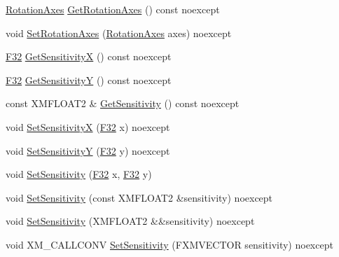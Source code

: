 \begin{DoxyCompactItemize}
\item 
\hyperlink{classmage_1_1script_1_1_mouse_look_script_aa8c8ce1a3e6ccefa7b8ddd31be209c23}{Rotation\+Axes} \hyperlink{classmage_1_1script_1_1_mouse_look_script_a612d8c23cc3f0711a07b32304082dfb5}{Get\+Rotation\+Axes} () const noexcept
\item 
void \hyperlink{classmage_1_1script_1_1_mouse_look_script_a82697e11738554a44b4a749227e231ee}{Set\+Rotation\+Axes} (\hyperlink{classmage_1_1script_1_1_mouse_look_script_aa8c8ce1a3e6ccefa7b8ddd31be209c23}{Rotation\+Axes} axes) noexcept
\item 
\hyperlink{namespacemage_aa97e833b45f06d60a0a9c4fc22ae02c0}{F32} \hyperlink{classmage_1_1script_1_1_mouse_look_script_a86ee9593f0221bfa259f5ae5dd6edb30}{Get\+SensitivityX} () const noexcept
\item 
\hyperlink{namespacemage_aa97e833b45f06d60a0a9c4fc22ae02c0}{F32} \hyperlink{classmage_1_1script_1_1_mouse_look_script_a39303e2d535ecc610ac4ea2f23825452}{Get\+SensitivityY} () const noexcept
\item 
const X\+M\+F\+L\+O\+A\+T2 \& \hyperlink{classmage_1_1script_1_1_mouse_look_script_a5dbf9911e65f1462e2ca84f70b8871d9}{Get\+Sensitivity} () const noexcept
\item 
void \hyperlink{classmage_1_1script_1_1_mouse_look_script_a97c2564df1660fb9d07f9a4269a77568}{Set\+SensitivityX} (\hyperlink{namespacemage_aa97e833b45f06d60a0a9c4fc22ae02c0}{F32} x) noexcept
\item 
void \hyperlink{classmage_1_1script_1_1_mouse_look_script_a95376c27d55cf12d557427b68ccbd802}{Set\+SensitivityY} (\hyperlink{namespacemage_aa97e833b45f06d60a0a9c4fc22ae02c0}{F32} y) noexcept
\item 
void \hyperlink{classmage_1_1script_1_1_mouse_look_script_a6116637b42e58b8f40de86ed47b54fe3}{Set\+Sensitivity} (\hyperlink{namespacemage_aa97e833b45f06d60a0a9c4fc22ae02c0}{F32} x, \hyperlink{namespacemage_aa97e833b45f06d60a0a9c4fc22ae02c0}{F32} y)
\item 
void \hyperlink{classmage_1_1script_1_1_mouse_look_script_ae87f7d74fa3863b5595fd4428c55caf5}{Set\+Sensitivity} (const X\+M\+F\+L\+O\+A\+T2 \&sensitivity) noexcept
\item 
void \hyperlink{classmage_1_1script_1_1_mouse_look_script_a0a9e3cabe60928aa3fa6ca3df8473e21}{Set\+Sensitivity} (X\+M\+F\+L\+O\+A\+T2 \&\&sensitivity) noexcept
\item 
void X\+M\+\_\+\+C\+A\+L\+L\+C\+O\+NV \hyperlink{classmage_1_1script_1_1_mouse_look_script_a784937d1254fe26ee28864d11956cd80}{Set\+Sensitivity} (F\+X\+M\+V\+E\+C\+T\+OR sensitivity) noexcept

\end{DoxyCompactItemize}
